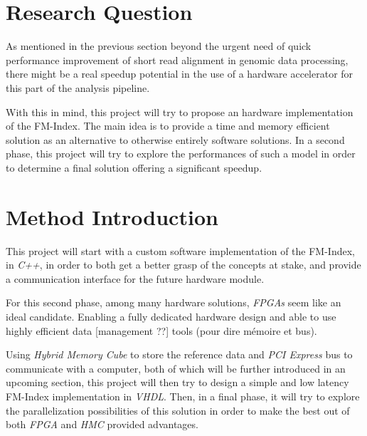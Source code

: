 \section{Research Question}

As mentioned in the previous section beyond the urgent need of quick performance improvement of short read alignment in genomic data processing, there might be a real speedup potential in the use of a hardware accelerator for this part of the analysis pipeline. 

With this in mind, this project will try to propose an hardware implementation of the FM-Index. The main idea is to provide a time and memory efficient solution as an alternative to otherwise entirely software solutions. In a second phase, this project will try to explore the performances of such a model in order to determine a final solution offering a significant speedup.

\section{Method Introduction}

This project will start with a custom software implementation of the FM-Index, in \textsl{C++}, in order to both get a better grasp of the concepts at stake, and provide a communication interface for the future hardware module.

 For this second phase, among many hardware solutions, \textsl{FPGAs} seem like an ideal candidate. Enabling a fully dedicated hardware design and able to use  highly efficient data [management ??] tools (pour dire mémoire et bus).

Using \textsl{Hybrid Memory Cube} to store the reference data and \textsl{PCI Express} bus to communicate with a computer, both of which will be further introduced in an upcoming section, this project will then try to design a simple and low latency FM-Index implementation in \textsl{VHDL}. Then, in a final phase, it will try to explore the parallelization possibilities of this solution in order to make the best out of both \textsl{FPGA} and \textsl{HMC} provided advantages.